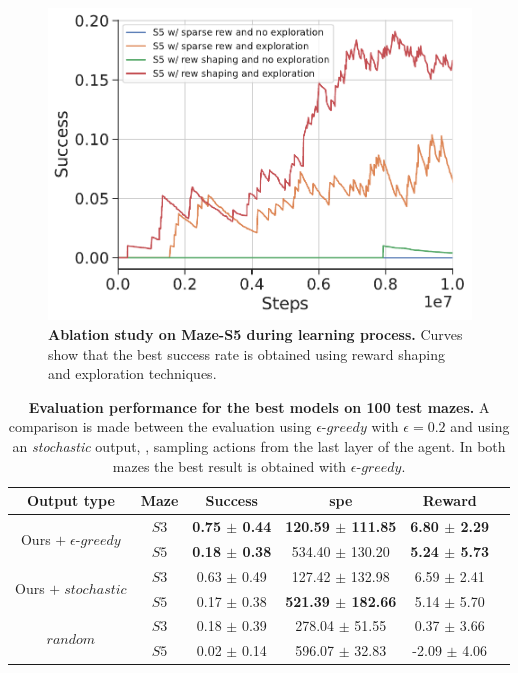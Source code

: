 \begin{figure}
    \centering
    \includegraphics[width=0.8\linewidth]{figures/understanding_vsn/S5_ablation_success}
    \caption{\textbf{Ablation study on Maze-S5 during learning process.} Curves show that the best success rate is obtained using reward shaping and exploration techniques.}
    \label{fig:ablation-maze-success}
\end{figure}

\begin{table}
    \centering
    \begin{tabular}{c c c c c c}
        \toprule
        Output type                                        & Maze & Success                  & \acrshort{spe}               & Reward                   \\
        \midrule
        \multirow{2}{*}{Ours $+\; \epsilon\text{-}greedy$} & $S3$ & \textbf{0.75 $\pm$ 0.44} & \textbf{120.59 $\pm$ 111.85} & \textbf{6.80 $\pm$ 2.29} \\
        & $S5$ & \textbf{0.18 $\pm$ 0.38} & 534.40 $\pm$ 130.20          & \textbf{5.24 $\pm$ 5.73} \\
        \multirow{2}{*}{Ours $+\; stochastic$}             & $S3$ & 0.63 $\pm$ 0.49          & 127.42 $\pm$ 132.98          & 6.59 $\pm$ 2.41          \\
        & $S5$ & 0.17 $\pm$ 0.38          & \textbf{521.39 $\pm$ 182.66} & 5.14 $\pm$ 5.70          \\
        \multirow{2}{*}{$random$}                          & $S3$ & 0.18 $\pm$ 0.39          & 278.04 $\pm$ 51.55           & 0.37 $\pm$ 3.66          \\
        & $S5$ & 0.02 $\pm$ 0.14          & 596.07 $\pm$ 32.83           & -2.09 $\pm$ 4.06         \\
        \bottomrule
    \end{tabular}
    \caption{\textbf{Evaluation performance for the best models on 100 test mazes.} A comparison is made between the evaluation using $\epsilon\text{-}greedy$ with $\epsilon=0.2$ and using an \textit{stochastic} output, \ie, sampling actions from the last layer of the agent. In both mazes the best result is obtained with $\epsilon\text{-}greedy$.}
    \label{tab:results-maze}
\end{table}

